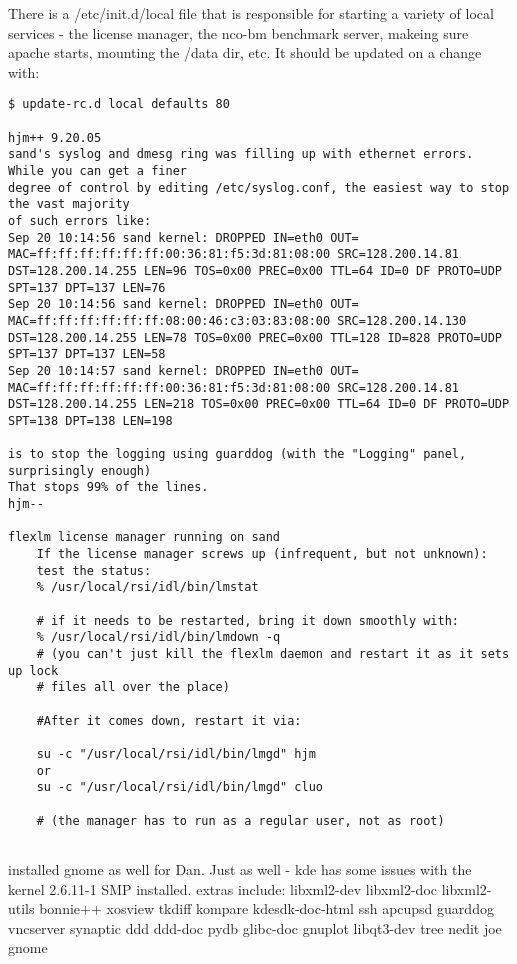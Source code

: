 \documentclass[12pt,twoside]{article}
\begin{document}
There is a /etc/init.d/local file that is responsible for starting a variety 
of local services - the license manager, the nco-bm benchmark server, makeing 
sure apache starts, mounting the /data dir, etc.  It should be updated on a 
change with:
\begin{verbatim}
$ update-rc.d local defaults 80

hjm++ 9.20.05
sand's syslog and dmesg ring was filling up with ethernet errors. While you can get a finer 
degree of control by editing /etc/syslog.conf, the easiest way to stop the vast majority 
of such errors like:
Sep 20 10:14:56 sand kernel: DROPPED IN=eth0 OUT= MAC=ff:ff:ff:ff:ff:ff:00:36:81:f5:3d:81:08:00 SRC=128.200.14.81 DST=128.200.14.255 LEN=96 TOS=0x00 PREC=0x00 TTL=64 ID=0 DF PROTO=UDP SPT=137 DPT=137 LEN=76
Sep 20 10:14:56 sand kernel: DROPPED IN=eth0 OUT= MAC=ff:ff:ff:ff:ff:ff:08:00:46:c3:03:83:08:00 SRC=128.200.14.130 DST=128.200.14.255 LEN=78 TOS=0x00 PREC=0x00 TTL=128 ID=828 PROTO=UDP SPT=137 DPT=137 LEN=58
Sep 20 10:14:57 sand kernel: DROPPED IN=eth0 OUT= MAC=ff:ff:ff:ff:ff:ff:00:36:81:f5:3d:81:08:00 SRC=128.200.14.81 DST=128.200.14.255 LEN=218 TOS=0x00 PREC=0x00 TTL=64 ID=0 DF PROTO=UDP SPT=138 DPT=138 LEN=198

is to stop the logging using guarddog (with the "Logging" panel, surprisingly enough)
That stops 99% of the lines.
hjm--

flexlm license manager running on sand
    If the license manager screws up (infrequent, but not unknown):
    test the status:
    % /usr/local/rsi/idl/bin/lmstat

    # if it needs to be restarted, bring it down smoothly with:
    % /usr/local/rsi/idl/bin/lmdown -q
    # (you can't just kill the flexlm daemon and restart it as it sets up lock
    # files all over the place)

    #After it comes down, restart it via:

    su -c "/usr/local/rsi/idl/bin/lmgd" hjm
    or
    su -c "/usr/local/rsi/idl/bin/lmgd" cluo

    # (the manager has to run as a regular user, not as root)
        
\end{verbatim}
installed gnome as well for Dan.  Just as well - kde has some issues with the 
kernel 2.6.11-1 SMP installed.
extras include:
libxml2-dev libxml2-doc libxml2-utils
bonnie++
xosview
tkdiff
kompare
kdesdk-doc-html
ssh apcupsd
guarddog
vncserver
synaptic
ddd ddd-doc pydb  glibc-doc gnuplot
libqt3-dev tree nedit joe 
gnome 
\end{document}
